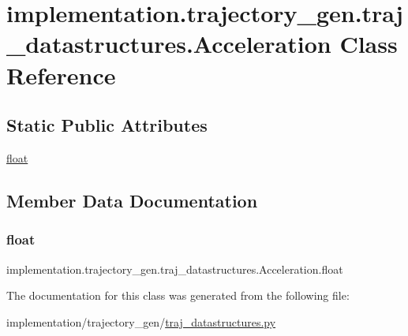 \hypertarget{classimplementation_1_1trajectory__gen_1_1traj__datastructures_1_1_acceleration}{}\section{implementation.\+trajectory\+\_\+gen.\+traj\+\_\+datastructures.\+Acceleration Class Reference}
\label{classimplementation_1_1trajectory__gen_1_1traj__datastructures_1_1_acceleration}
\subsection*{Static Public Attributes}
\begin{DoxyCompactItemize}
\item 
\hyperlink{classimplementation_1_1trajectory__gen_1_1traj__datastructures_1_1_acceleration_af2ca293e944f1d9055ba5084701af301}{float}
\end{DoxyCompactItemize}


\subsection{Member Data Documentation}
\mbox{\label{classimplementation_1_1trajectory__gen_1_1traj__datastructures_1_1_acceleration_af2ca293e944f1d9055ba5084701af301}} 
\subsubsection{\texorpdfstring{float}{float}}
{\footnotesize\ttfamily implementation.\+trajectory\+\_\+gen.\+traj\+\_\+datastructures.\+Acceleration.\+float\hspace{0.3cm}{\ttfamily [static]}}



The documentation for this class was generated from the following file\+:\begin{DoxyCompactItemize}
\item 
implementation/trajectory\+\_\+gen/\hyperlink{traj__datastructures_8py}{traj\+\_\+datastructures.\+py}\end{DoxyCompactItemize}

